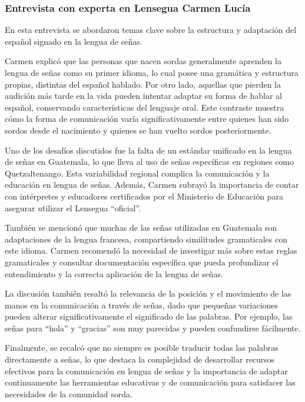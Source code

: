 \subsubsection{Entrevista con experta en Lensegua Carmen Lucía}

En esta entrevista se abordaron temas clave sobre la estructura y adaptación del español signado en la lengua de señas. 

Carmen explicó que las personas que nacen sordas generalmente aprenden la lengua de señas como su primer idioma, lo cual posee una gramática y estructura propias, distintas del español hablado. Por otro lado, aquellas que pierden la audición más tarde en la vida pueden intentar adaptar su forma de hablar al español, conservando características del lenguaje oral. Este contraste muestra cómo la forma de comunicación varía significativamente entre quienes han sido sordos desde el nacimiento y quienes se han vuelto sordos posteriormente.

Uno de los desafíos discutidos fue la falta de un estándar unificado en la lengua de señas en Guatemala, lo que lleva al uso de señas específicas en regiones como Quetzaltenango. Esta variabilidad regional complica la comunicación y la educación en lengua de señas. Además, Carmen subrayó la importancia de contar con intérpretes y educadores certificados por el Ministerio de Educación para asegurar utilizar el Lensegua “oficial”. 

También se mencionó que muchas de las señas utilizadas en Guatemala son adaptaciones de la lengua francesa, compartiendo similitudes gramaticales con este idioma. Carmen recomendó la necesidad de investigar más sobre estas reglas gramaticales y consultar documentación específica que pueda profundizar el entendimiento y la correcta aplicación de la lengua de señas.

La discusión también resaltó la relevancia de la posición y el movimiento de las manos en la comunicación a través de señas, dado que pequeñas variaciones pueden alterar significativamente el significado de las palabras. Por ejemplo, las señas para ``hola'' y ``gracias'' son muy parecidas y pueden confundirse fácilmente. 

Finalmente, se recalcó que no siempre es posible traducir todas las palabras directamente a señas, lo que destaca la complejidad de desarrollar recursos efectivos para la comunicación en lengua de señas y la importancia de adaptar continuamente las herramientas educativas y de comunicación para satisfacer las necesidades de la comunidad sorda.


